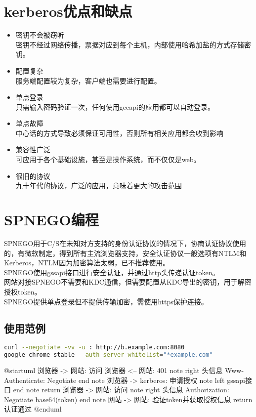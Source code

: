 \documentclass[a4paper]{scrartcl}
\begin{document}
\section{kerberos优点和缺点}
\begin{itemize}
    \item 密钥不会被窃听\\
    密钥不经过网络传播，票据对应到每个主机，内部使用哈希加盐的方式存储密钥。
    \item 配置复杂\\
    服务端配置较为复杂，客户端也需要进行配置。
    \item 单点登录\\
    只需输入密码验证一次，任何使用geeapi的应用都可以自动登录。
    \item 单点故障\\
    中心话的方式导致必须保证可用性，否则所有相关应用都会收到影响
    \item 兼容性广泛\\
    可应用于各个基础设施，甚至是操作系统，而不仅仅是web。
    \item 很旧的协议\\
    九十年代的协议，广泛的应用，意味着更大的攻击范围
\end{itemize}

\clearpage
\section{SPNEGO编程}
SPNEGO用于C/S在未知对方支持的身份认证协议的情况下，协商认证协议使用的，有微软制定，得到所有主流浏览器支持，安全认证协议一般选项有NTLM和Kerberos，NTLM因为加密算法太弱，已不推荐使用。
\\
SPNEGO使用gssapi接口进行安全认证，并通过http头传递认证token。
\\
网站对接SPNEGO不需要和KDC通信，但需要配置从KDC导出的密钥，用于解密授权token。
\\
SPNEGO提供单点登录但不提供传输加密，需使用https保护连接。
\subsection{使用范例}
\begin{lstlisting}[language={bash}]
curl --negotiate -vv -u : http://b.example.com:8080
google-chrome-stable --auth-server-whitelist="*example.com"
\end{lstlisting}

\begin{plantuml}
    @startuml
        浏览器 -> 网站: 访问
        浏览器 <-- 网站: 401
        note right
        头信息
        Www-Authenticate: Negotiate
        end note
        浏览器 -> kerberos: 申请授权
        note left
        gssapi接口
        end note
        return
        浏览器 -> 网站: 访问
        note right
        头信息
        Authorization: Negotiate base64(token)
        end note
        网站 -> 网站: 验证token并获取授权信息
        return 认证通过
    @enduml
\end{plantuml}
\clearpage
\end{document}
